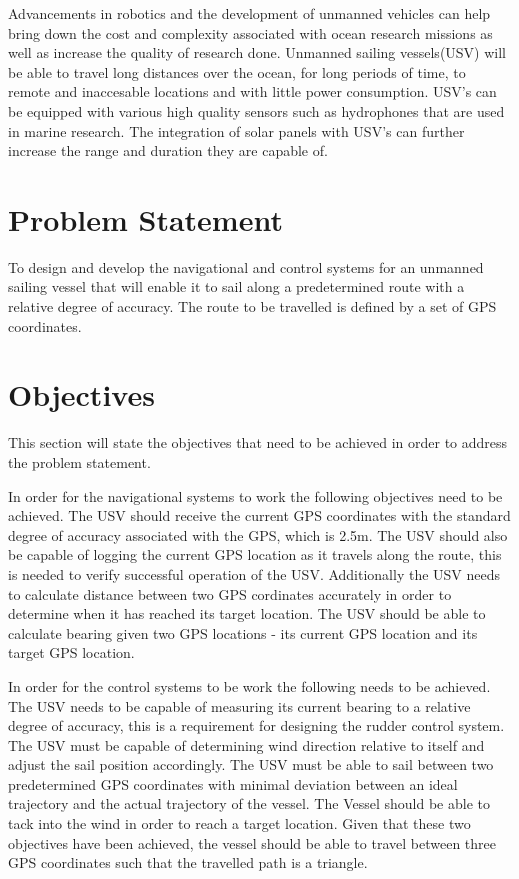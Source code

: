 Advancements in robotics and the development of unmanned vehicles can help bring down the cost and complexity associated with ocean research missions 
as well as increase the quality of research done. Unmanned sailing vessels(USV) will be able to travel long distances over the ocean, for long periods of 
time, to remote and inaccesable locations and with little power consumption. USV's can be equipped with various high quality sensors 
such as hydrophones that are used in marine research. The integration of solar panels with USV's can further increase the range and 
duration they are capable of.

\section{Problem Statement}
\label{problem_statement}
To design and develop the navigational and control systems for an unmanned sailing vessel that will enable it to sail along a predetermined route with a 
relative degree of accuracy. The route to be travelled is defined by a set of GPS coordinates. 

\section{Objectives}
This section will state the objectives that need to be achieved in order to address the problem statement.

In order for the navigational systems to work the following objectives need to be achieved. The USV should receive the current GPS coordinates with the 
standard degree of accuracy associated with the GPS, which is 2.5m. The USV 
should also be capable of logging the current GPS location as it travels along the route, this is needed to verify successful operation of the USV. 
Additionally the USV needs to calculate distance between two GPS cordinates accurately in order to determine when it has reached its target location. 
The USV should be able to calculate bearing given two GPS locations - its current GPS location and its target GPS location.


In order for the control systems to be work the following needs to be achieved.
The USV needs to be capable of measuring its current bearing to a relative degree of accuracy, this is a requirement for designing the rudder control system. 
The USV must be capable of determining wind direction relative to itself and adjust the sail position accordingly. 
The USV must be able to sail between two predetermined GPS coordinates with minimal deviation between an ideal trajectory and the actual trajectory of the vessel.
The Vessel should be able to tack into the wind in order to reach a target location. Given that these two objectives have been achieved, the vessel should be
able to travel between three GPS coordinates such that the travelled path is a triangle.

